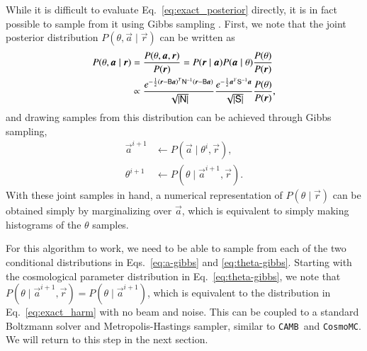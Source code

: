 \documentclass[twocolumn]{aa}
\def\cosmomc{\texttt{CosmoMC}}
\def\camb{\texttt{CAMB}}
\newcommand{\B}[0]{\tens{B}}
\renewcommand{\a}[0]{\vec{a}}
\newcommand{\N}[0]{\tens{N}}
\renewcommand{\S}[0]{\tens{S}}
\renewcommand{\r}[0]{\vec{r}}
\begin{document}
While it is difficult to evaluate Eq.~\eqref{eq:exact_posterior} directly, it is in fact possible to sample from it using Gibbs sampling \citep{jewell2004,wandelt2004}. First, we note that the joint posterior distribution $P(\theta, \a \mid \r)$ can be written as
\begin{align}
    \nonumber
    P(\theta, \a \mid \r) &= \frac{P(\theta, \a, \r)}{P(\r)} = P(\r \mid \a)P(\a\mid \theta)\frac{P(\theta)}{P(\r)}\\
    \label{eq:joint-posterior}
    &\propto \frac{e^{-\frac12 \left(\r-\B\a \right)^T \N^{-1}\left(\r-\B\a \right)}}{\sqrt{\left|\N\right|}}
    \frac{e^{-\frac12 \a^T \S^{-1}\a}}{\sqrt{\left|\S\right|}}\frac{P(\theta)}{P(\r)},
\end{align}
and drawing samples from this distribution can be achieved through Gibbs sampling,
\begin{align}
    \label{eq:a-gibbs}
    \a^{i+1} &\leftarrow P(\a \mid \theta^{i}, \r),\\
    \label{eq:theta-gibbs}
    \theta^{i+1} &\leftarrow P(\theta \mid \a^{i+1}, \r).
\end{align}
With these joint samples in hand, a numerical representation of $P(\theta \mid \r)$ can be obtained simply by marginalizing over $\a$, which is equivalent to simply making histograms of the $\theta$ samples.

For this algorithm to work, we need to be able to sample from each of the two conditional distributions in Eqs.~\eqref{eq:a-gibbs} and \eqref{eq:theta-gibbs}. Starting with the cosmological parameter distribution in Eq.~\eqref{eq:theta-gibbs}, we note that $P(\theta \mid \a^{i+1}, \r) = P(\theta \mid \a^{i+1})$, which is equivalent to the distribution in Eq.~\eqref{eq:exact_harm} with no beam and noise. This can be coupled to a standard Boltzmann solver and Metropolis-Hastings sampler, similar to \camb\ and \cosmomc. We will return to this step in the next section.
\end{document}
